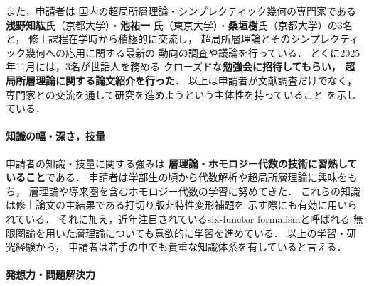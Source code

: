 \documentclass[11pt,a4paper,uplatex,dvipdfmx]{ujarticle} 		%
\newcommand{\研究課題名}{打切り超局所台を用いた層のフーリエ変換の研究とシンプレクティック幾何への応用}
\newcommand{\研究機関名}{北海道大学}
\newcommand{\研究代表者氏名}{大柴寿浩}
\begin{document}
また，申請者は
国内の超局所層理論・シンプレクティック幾何の専門家である
\textbf{浅野知紘}氏（京都大学）・\textbf{池祐一
}氏（東京大学）・\textbf{桑垣樹}氏（京都大学）の3名と，
修士課程在学時から積極的に交流し，
超局所層理論とそのシンプレクティック幾何への応用に関する最新の
動向の調査や議論を行っている．
とくに2025年11月には，3名が世話人を務める
クローズドな\textbf{勉強会に招待してもらい，
超局所層理論に関する論文紹介を行った}．
以上は申請者が文献調査だけでなく，
専門家との交流を通して研究を進めようという主体性を持っていること
を示している．

\paragraph*{知識の幅・深さ，技量}
申請者の知識・技量に関する強みは
\textbf{層理論・ホモロジー代数の技術に習熟していること}である．
申請者は学部生の頃から代数解析や超局所層理論に興味をもち，
層理論や導来圏を含むホモロジー代数の学習に努めてきた．
これらの知識は修士論文の主結果である打切り版非特性変形補題を
示す際にも有効に用いられている．
それに加え，近年注目されているsix-functor formalismと呼ばれる
無限圏論を用いた層理論についても意欲的に学習を進めている．
以上の学習・研究経験から，
申請者は若手の中でも貴重な知識体系を有していると言える．
\paragraph*{発想力・問題解決力}


\end{document}
